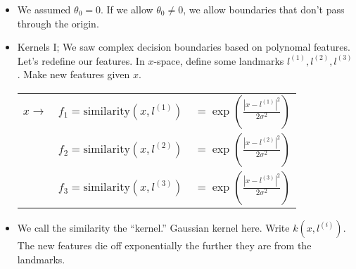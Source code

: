 \documentclass[10pt]{article}
\begin{document}
\begin{itemize}
  \item We assumed $\theta_0 = 0$. If we allow $\theta_0 \neq 0$, we allow boundaries that don't pass through the origin.
  \item Kernels I; We saw complex decision boundaries based on polynomal features. Let's redefine our features. In $x$-space, define some landmarks $l^{(1)},l^{(2)},l^{(3)}$. Make new features given $x$. \\
    \begin{center}
      \begin{tabular}{c c c}
        $x \rightarrow$ & $f_1 = \text{similarity}(x, l^{(1)})$ & $= \exp \left( \frac{ \left| x - l^{(1)} \right|^2}{2 \sigma^2 }\right)$ \\
                        & $f_2 = \text{similarity}(x, l^{(2)})$ & $= \exp \left( \frac{ \left| x - l^{(2)} \right|^2}{2 \sigma^2 }\right)$ \\
                        & $f_3 = \text{similarity}(x, l^{(3)})$ & $= \exp \left( \frac{ \left| x - l^{(3)} \right|^2}{2 \sigma^2 }\right)$
      \end{tabular}
    \end{center}
  \item We call the similarity the ``kernel.'' Gaussian kernel
    here. Write $k(x, l^{(i)})$. The new features die off
    exponentially the further they are from the landmarks.
\end{itemize}
\end{document}
